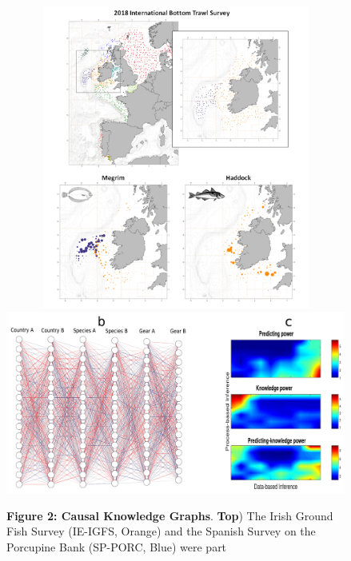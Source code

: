 \documentclass[11pt, a4paper]{article} %
\begin{document}
{


   \vspace{0.15 in}
   \begin{figure}[h!]
     \centering
     \hspace{-0.5 in}\includegraphics[width=14cm,height=10cm]{Figures/Figura.png}%
     \\
      \hspace{-0.5 in}\includegraphics[width=12cm,height=6cm]{Figures/CKG.pdf}%
     \caption*{\small {\bf Figure 2: Causal Knowledge Graphs}.  {\bf
         Top}) The Irish Ground Fish Survey (IE-IGFS, Orange) and the
       Spanish Survey on the Porcupine Bank (SP-PORC, Blue) were part
}
\end{figure}}
\end{document}

